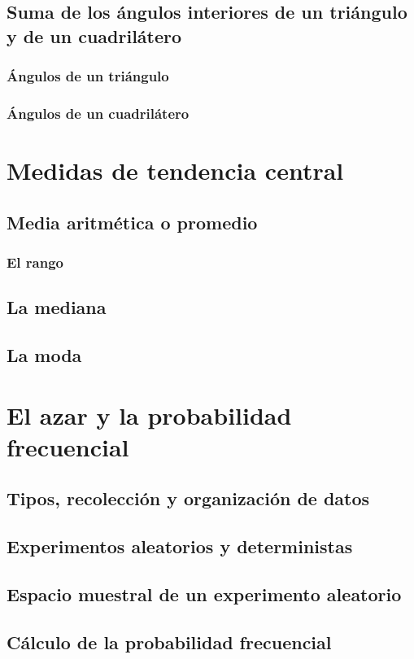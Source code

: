 \documentclass[12pt]{book}
\begin{document}
\begin{mainmatter}
    \subsection{Suma de los \'angulos interiores de un tri\'angulo y de un cuadril\'atero}
    \subsubsection{\'Angulos de un tri\'angulo}
    \subsubsection{\'Angulos de un cuadril\'atero}

    \section{Medidas de tendencia central}
    \subsection{Media aritm\'etica o promedio}
    \subsubsection{El rango}
    \subsection{La mediana}
    \subsection{La moda}

    \section{El azar y la probabilidad frecuencial}
    \subsection{Tipos, recolección y organización de datos}
    \subsection{Experimentos aleatorios y deterministas}
    \subsection{Espacio muestral de un experimento aleatorio}
    \subsection{Cálculo de la probabilidad frecuencial}


\end{mainmatter}
\end{document}
